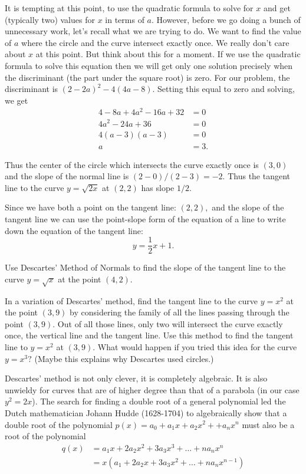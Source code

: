 \begin{myexample}
It is tempting at this point, to use the quadratic formula to solve
for $x$ and get (typically two) values for $x$ in terms of $a.$
However, before we go doing a bunch of unnecessary work, let's recall
what we are trying to do.  We want to find the value of $a$ where the
circle and the curve intersect exactly once.  We really don't care
about $x$ at this point.  But think about this for a moment. If we use
the quadratic formula to solve this equation then we will get only one
solution precisely when the discriminant (the part under the square
root) is zero.  For our problem, the discriminant is
$(2-2a)^2-4(4a-8).$ Setting this equal to zero and solving, we get
\begin{align*}
  4-8a+4a^2-16a+32&=0\\
  4a^2-24a+36&=0\\
  4(a-3)(a-3)&=0\\
  a&=3.
\end{align*}

 Thus the center of the circle which intersects the curve exactly once
 is $(3,0)$ and the slope of the normal line is  $(2-0)/(2-3)=-2.$
 Thus the tangent line to the curve $y=\sqrt{2x}$ at $(2,2)$ has slope
 $1/2.$  

 Since we have both a point on the tangent line: $(2,2),$ and the
 slope of the tangent line we can use the point-slope form of the
 equation of a line to write down the equation of the tangent
 line: $$y=\frac{1}{2}x+1.$$
\end{myexample}

 \begin{embeddedproblem}{}
   Use Descartes' Method of Normals to find the slope of the tangent
   line to the curve $y=\sqrt{x}$ at the point $(4,2).$
 \end{embeddedproblem}

 \begin{embeddedproblem}{}
   In a variation of Descartes' method, find the tangent line to the
   curve $y=x^2$ at the point $(3,9)$ by considering the family of all
   the lines passing through the point $(3,9).$ Out of all those lines, only
   two will intersect the curve exactly once, the vertical line and
   the tangent line.  Use this method to find the tangent line to
   $y=x^2$ at $(3,9).$ What would happen if you tried this idea for
   the curve $y=x^3?$ (Maybe this explains why Descartes used
   circles.)
 \end{embeddedproblem}

 Descartes' method is not only clever, it is completely
 algebraic.  It is also  unwieldy for curves that are of
 higher degree than that of a parabola (in our case $y^2=2x$). The
 search for finding a double root of a general polynomial led the
 Dutch mathematician Johann Hudde (1628-1704) to algebraically show
 that a double root of the polynomial $p(x)=a_0+a_1 x+a_2 x^2++a_n
 x^n$ must also be a root of the polynomial
 \begin{align*}
   q(x)&=a_1 x+2a_2 x^2+3a_3 x^3+\ldots+na_n x^n\\
       &=x\left(a_1+2a_2 x+3a_3x^2+\ldots+na_n x^{n-1}\right)
 \end{align*}

